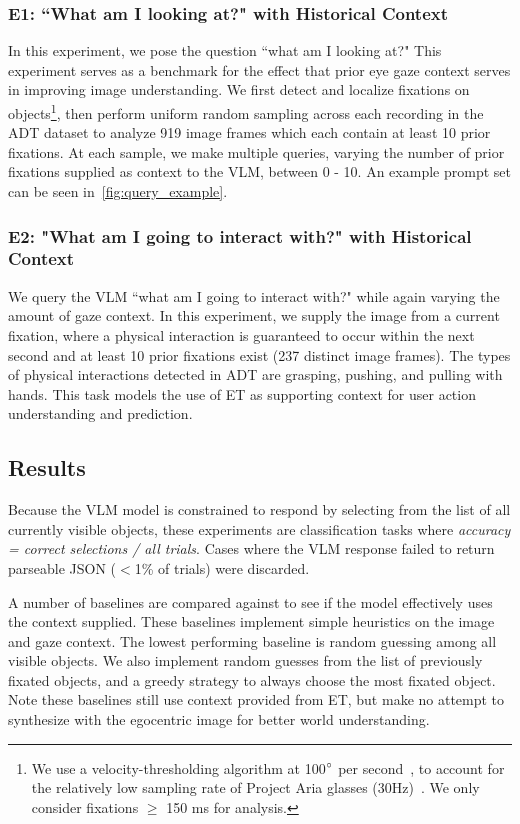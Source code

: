 \subsubsection{E1: ``What am I looking at?" with Historical Context}

In this experiment, we pose the question ``what am I looking at?"  This experiment serves as a benchmark for the effect that prior eye gaze context serves in improving image understanding.  We first detect and localize fixations on objects\footnote{We use a velocity-thresholding algorithm at 100$\degree$ per second~\cite{salvucci_fixations_2000}, to account for the relatively low sampling rate of Project Aria glasses (30Hz)~\cite{engel_aria_2023}.  We only consider fixations $\geq$ 150 ms for analysis.}, then perform uniform random sampling across each recording in the ADT dataset to analyze 919 image frames which each contain at least 10 prior fixations.  At each sample, we make multiple queries, varying the number of prior fixations supplied as context to the VLM, between 0 - 10.  An example prompt set can be seen in~\autoref{fig:query_example}.

\subsubsection{E2: "What am I going to interact with?" with Historical Context}

We query the VLM ``what am I going to interact with?" while again varying the amount of gaze context.  In this experiment, we supply the image from a current fixation, where a physical interaction is guaranteed to occur within the next second and at least 10 prior fixations exist (237 distinct image frames).  The types of physical interactions detected in ADT are grasping, pushing, and pulling with hands.  This task models the use of ET as supporting context for user action understanding and prediction.

\subsection{Results}

Because the VLM model is constrained to respond by selecting from the list of all currently visible objects, these experiments are classification tasks where \textit{accuracy = correct selections / all trials}.  Cases where the VLM response failed to return parseable JSON ($<$1\% of trials) were discarded.

A number of baselines are compared against to see if the model effectively uses the context supplied.  These baselines implement simple heuristics on the image and gaze context.  The lowest performing baseline is random guessing among all visible objects.  We also implement random guesses from the list of previously fixated objects, and a greedy strategy to always choose the most fixated object.  Note these baselines still use context provided from ET, but make no attempt to synthesize with the egocentric image for better world understanding.


